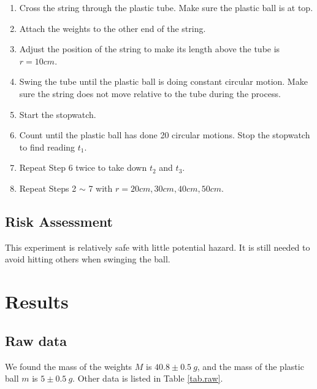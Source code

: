 \documentclass[a4paper]{article}
\begin{document}
\begin{enumerate}[1.]
    \item Cross the string through the plastic tube. Make sure the plastic ball is at top.
    \item Attach the weights to the other end of the string.
    \item Adjust the position of the string to make its length above the tube is $r = 10cm$.
    \item Swing the tube until the plastic ball is doing constant circular motion. Make sure the string does not move relative to the tube during the process.
    \item Start the stopwatch.
    \item Count until the plastic ball has done 20 circular motions. Stop the stopwatch to find reading $t_1$.
    \item Repeat Step 6 twice to take down $t_2$ and $t_3$.
    \item Repeat Steps 2 $\sim$ 7 with $r = 20cm, 30cm, 40cm, 50cm$.
\end{enumerate}

\subsection{Risk Assessment}

This experiment is relatively safe with little potential hazard. It is still needed to avoid hitting others when swinging the ball.

\section{Results}
\subsection{Raw data}

We found the mass of the weights $M$ is $40.8\pm 0.5\SI{}{g}$, and the mass of the plastic ball $m$ is $5\pm 0.5\SI{}{g}$. Other data is listed in Table \ref{tab.raw}.
\end{document}
